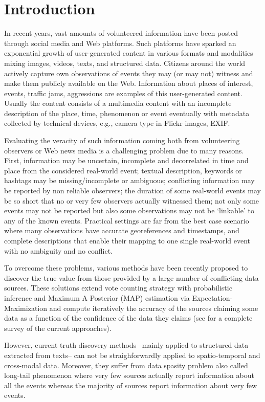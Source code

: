 \section{Introduction}

In recent years, vast amounts of volunteered information have been posted through social media  and Web platforms. Such platforms have sparked an exponential growth of user-generated content in various formats and modalities mixing images, videos, texts, and structured data.  Citizens around the world actively capture own observations of events they may (or may not) witness and make them publicly available on the Web. 
Information about places of interest, events, traffic jams, aggressions are examples of this user-generated content. 
Usually the content consists of a multimedia content with an incomplete description of the place, time, phenomenon or event  eventually with metadata collected by technical devices, e.g., camera type in Flickr images, EXIF.


Evaluating the veracity of such information coming both from volunteering observers or  Web news media is a challenging problem due to many reasons. First, information may be uncertain, incomplete and decorrelated in time and place from the considered real-world event; textual description, keywords or hashtags may be missing/incomplete or ambiguous; conflicting information may be reported by non reliable observers; the duration of some real-world events may be so short that no or very few observers actually witnessed them; not only some events may not be reported but also some observations may not be `linkable' to any of the known events.  Practical settings are far from the best case scenario where many observations have accurate georeferences and timestamps, and  complete descriptions that enable their mapping to one single real-world event with no ambiguity and no conflict.  

To overcome these problems, various methods have been recently proposed to discover
the true value from those provided by a large number of conflicting data sources.  These solutions extend
vote counting strategy with probabilistic inference and Maximum A Posterior (MAP) estimation via Expectation-Maximization and compute iteratively
the accuracy of the sources claiming some data as a function of the confidence of the data they claims (see \cite{} for a complete survey of the current
approaches).

However, current truth discovery methods --mainly applied to structured data extracted from texts-- can not be straighforwardly applied to spatio-temporal and cross-modal data. 
Moreover, they  suffer from data spasity problem also called long-tail phenomenon where very few sources actually report information about all the events whereas the majority of sources report information about very few events.


